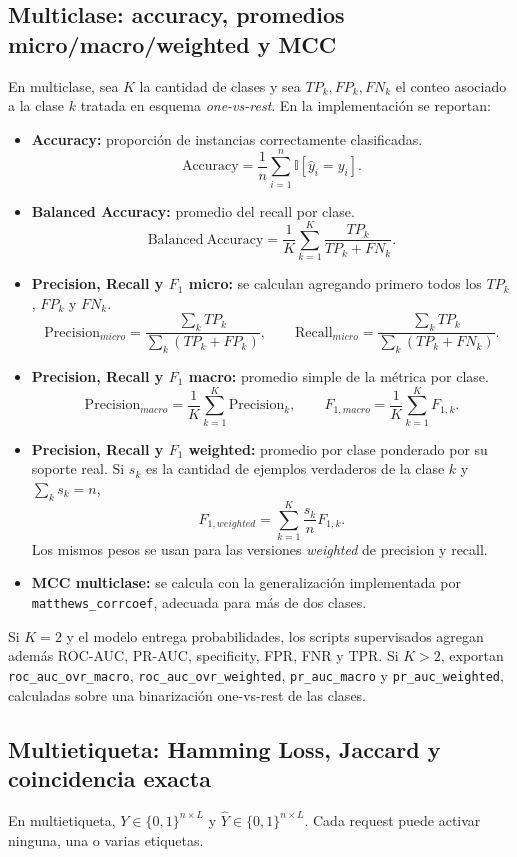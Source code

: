 \documentclass[12pt,oneside]{report}
\newcommand{\ind}{\mathbb{I}} %
\begin{document}
\subsection{Multiclase: accuracy, promedios micro/macro/weighted y MCC}
En multiclase, sea $K$ la cantidad de clases y sea $TP_k,FP_k,FN_k$ el conteo asociado a la clase $k$ tratada en esquema \emph{one-vs-rest}. En la implementación se reportan:
\begin{itemize}[leftmargin=*]
  \item \textbf{Accuracy:} proporción de instancias correctamente clasificadas.
  \[
  \mathrm{Accuracy}=\frac{1}{n}\sum_{i=1}^{n}\ind[\hat y_i=y_i].
  \]
  \item \textbf{Balanced Accuracy:} promedio del recall por clase.
  \[
  \mathrm{Balanced\ Accuracy}=\frac{1}{K}\sum_{k=1}^{K}\frac{TP_k}{TP_k+FN_k}.
  \]
  \item \textbf{Precision, Recall y $F_1$ micro:} se calculan agregando primero todos los $TP_k$, $FP_k$ y $FN_k$.
  \[
  \mathrm{Precision}_{micro}=\frac{\sum_k TP_k}{\sum_k(TP_k+FP_k)},\qquad
  \mathrm{Recall}_{micro}=\frac{\sum_k TP_k}{\sum_k(TP_k+FN_k)}.
  \]
  \item \textbf{Precision, Recall y $F_1$ macro:} promedio simple de la métrica por clase.
  \[
  \mathrm{Precision}_{macro}=\frac{1}{K}\sum_{k=1}^{K}\mathrm{Precision}_k,
  \qquad
  F_{1,macro}=\frac{1}{K}\sum_{k=1}^{K}F_{1,k}.
  \]
  \item \textbf{Precision, Recall y $F_1$ weighted:} promedio por clase ponderado por su soporte real.
  Si $s_k$ es la cantidad de ejemplos verdaderos de la clase $k$ y $\sum_k s_k=n$,
  \[
  F_{1,weighted}=\sum_{k=1}^{K}\frac{s_k}{n}F_{1,k}.
  \]
  Los mismos pesos se usan para las versiones \textit{weighted} de precision y recall.
  \item \textbf{MCC multiclase:} se calcula con la generalización implementada por \texttt{matthews\_corrcoef}, adecuada para más de dos clases.
\end{itemize}

Si $K=2$ y el modelo entrega probabilidades, los scripts supervisados agregan además ROC-AUC, PR-AUC, specificity, FPR, FNR y TPR. Si $K>2$, exportan \texttt{roc\_auc\_ovr\_macro}, \texttt{roc\_auc\_ovr\_weighted}, \texttt{pr\_auc\_macro} y \texttt{pr\_auc\_weighted}, calculadas sobre una binarización one-vs-rest de las clases.

\subsection{Multietiqueta: Hamming Loss, Jaccard y coincidencia exacta}
En multietiqueta, $Y\in\{0,1\}^{n\times L}$ y $\hat{Y}\in\{0,1\}^{n\times L}$. Cada request puede activar ninguna, una o varias etiquetas.
\end{document}
